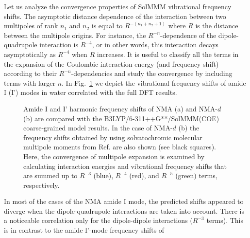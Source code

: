 \documentclass[a4paper,titlepage,twoside,fleqn,12pt]{book}
\begin{document}
\begin{refsection}
Let us analyze the convergence properties of SolMMM vibrational
frequency shifts.
The asymptotic distance dependence of the interaction between
two multipoles of rank $n_1$ and $n_2$ is equal to $R^{-(n_1+n_2+1)}$
where $R$ is the distance between the multipole origins.
For instance, the $R^{-n}$\hyp{}dependence of the dipole\hyp{}quadrupole
interaction is $R^{-4}$, or in other words, this interaction decays asymptotically
as $R^{-4}$ when $R$ increases. It is useful to classify all the terms in the
expansion of the Coulombic interaction energy (and frequency shift)
according to their $R^{-n}$\hyp{}dependencies and study the convergence
by including terms with larger $n$. In Fig.~\ref{f:solmmm} we depict the
vibrational frequency shifts of amide I (I') modes in water
correlated with the full DFT results.
%
\begin{figure}[t!]
\centering
\setlength\fboxsep{0.4pt}
\setlength\fboxrule{0.5pt}
\caption{
Amide I and I' harmonic frequency shifts of NMA (a) and NMA-$d$ (b) 
are compared with the B3LYP/6-311++G**/SolMMM(COE) coarse\hyp{}grained
model results. In the case of NMA-$d$ (b) the frequency shifts obtained 
by using solvatochromic molecular multipole moments from Ref.\citep{Lee.Choi.Cho.JCP.2012} 
are also shown (see black squares). Here, the convergence of multipole expansion 
is examined by calculating interaction energies and vibrational frequency shifts 
that are summed up to $R^{-3}$ (blue), $R^{-4}$ (red), and $R^{-5}$ (green) terms, 
respectively.
\label{f:solmmm}}
\end{figure}
%
In most of the cases of the NMA amide I mode, the predicted
shifts appeared to diverge when the dipole\hyp{}quadrupole
interactions are taken into account. 
There is a noticeable correlation only for the
dipole\hyp{}dipole interactions ($R^{-3}$ terms).
This is in contrast to the amide I'\hyp{}mode frequency shifts of

\end{refsection}
\end{document}

